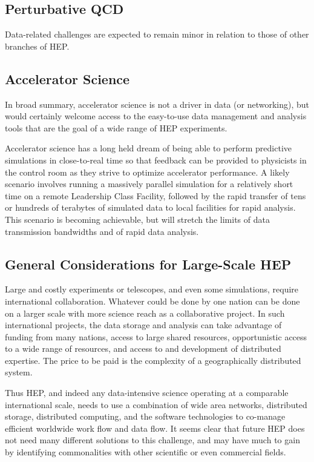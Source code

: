 \subsection{Perturbative QCD}
Data-related challenges are expected to remain minor in relation to those of other branches of HEP.

\subsection{Accelerator Science}
In broad summary, accelerator science is not a driver in data (or networking), but would 
certainly welcome access to the easy-to-use data management and analysis tools that are 
the goal of a wide range of HEP experiments.

Accelerator science has a long held dream of being able to perform predictive simulations 
in close-to-real time so that feedback can be provided to physicists in the control room as 
they strive to optimize accelerator performance.  A likely scenario involves running a massively 
parallel simulation for a relatively short time on a remote Leadership Class Facility, followed 
by the rapid transfer of tens or hundreds of terabytes of simulated data to local facilities 
for rapid analysis.  This scenario is becoming achievable, but will stretch the limits of data 
transmission bandwidths and of rapid data analysis.

\subsection{General Considerations for Large-Scale HEP}
Large and costly experiments or telescopes, and even some simulations, require 
international collaboration.  Whatever could be done by one nation can be done 
on a larger scale with more science reach as a collaborative project.  In such 
international projects, the data storage and analysis can take advantage of funding 
from many nations, access to large shared resources, opportunistic access to a wide 
range of resources, and access to and development of distributed expertise.  
The price to be paid is the complexity of a geographically distributed system.

Thus HEP, and indeed any data-intensive science operating at a comparable 
international scale, needs to use a combination of wide area networks, 
distributed storage, distributed computing, and the software technologies 
to co-manage efficient worldwide work flow and data flow.  It seems clear 
that future HEP does not need many different solutions to this challenge, 
and may have much to gain by identifying commonalities with other 
scientific or even commercial fields.

